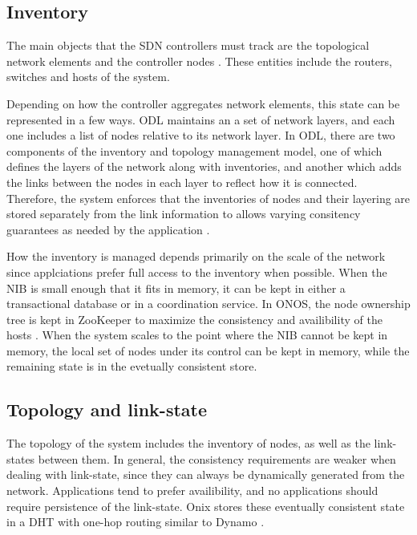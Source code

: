 \documentclass[letterpaper,twocolumn,10pt]{article}
\begin{document}
\subsection*{Inventory}

The main objects that the SDN controllers must track are the topological network elements and the controller nodes \cite{network2015topologies}. These entities include the routers, switches and hosts of the system.

Depending on how the controller aggregates network elements, this state can be represented in a few ways. ODL maintains an a set of network layers, and each one includes a list of nodes relative to its network layer. In ODL, there are two components of the inventory and topology management model, one of which defines the layers of the network along with inventories, and another which adds the links between the nodes in each layer to reflect how it is connected.
Therefore, the system enforces that the inventories of nodes and their layering are stored separately from the link information to allows varying consitency guarantees as needed by the application \cite{ODL}.

How the inventory is managed depends primarily on the scale of the network since applciations prefer full access to the inventory when possible. When the NIB is small enough that it fits in memory, it can be kept in either a transactional database or in a coordination service. In ONOS, the node ownership tree is kept in ZooKeeper to maximize the consistency and availibility of the hosts \cite{berde2014onos}. When the system scales to the point where the NIB cannot be kept in memory, the local set of nodes under its control can be kept in memory, while the remaining state is in the evetually consistent store.

\subsection*{Topology and link-state}

The topology of the system includes the inventory of nodes, as well as the link-states between them. In general, the consistency requirements are weaker when dealing with link-state, since they can always be dynamically generated from the network. Applications tend to prefer availibility, and no applications should require persistence of the link-state. Onix stores these eventually consistent state in a DHT with one-hop routing similar to Dynamo \cite{decandia2007dynamo}.
\end{document}
